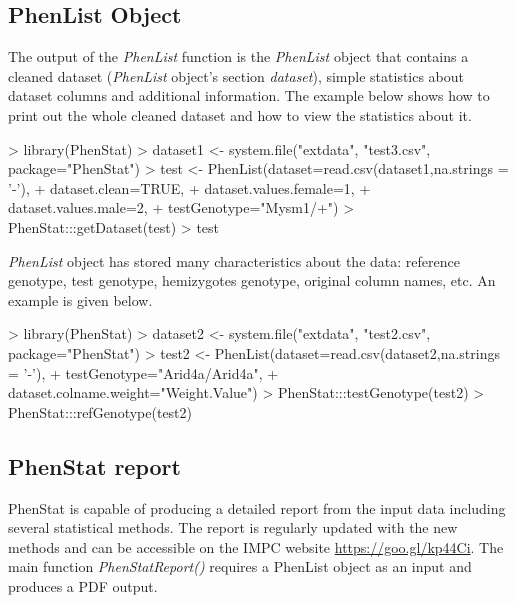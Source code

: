 \documentclass[a4paper]{article}
\begin{document}
\subsection{PhenList Object}
The output of the \textit{PhenList} function is the \textit{PhenList} object that contains a cleaned dataset
(\textit{PhenList} object's section \textit{dataset}), simple statistics about dataset columns and additional
information.
\newline\newline
The example below shows how to print out the whole cleaned dataset and how to view the statistics about it.

\begin{Schunk}
\begin{Sinput}
> library(PhenStat)
> dataset1 <- system.file("extdata", "test3.csv", package="PhenStat")
> test <- PhenList(dataset=read.csv(dataset1,na.strings = '-'),
+                  dataset.clean=TRUE,
+                  dataset.values.female=1,
+                  dataset.values.male=2,
+                  testGenotype="Mysm1/+")
> PhenStat:::getDataset(test)
> test
\end{Sinput}
\end{Schunk}
\textit{PhenList} object has stored many characteristics about the data: reference genotype, test genotype,
hemizygotes genotype, original column names, etc.
\newline
An example is given below.
\begin{Schunk}
\begin{Sinput}
> library(PhenStat)
> dataset2 <- system.file("extdata", "test2.csv", package="PhenStat")
> test2 <- PhenList(dataset=read.csv(dataset2,na.strings = '-'),
+                   testGenotype="Arid4a/Arid4a",
+                   dataset.colname.weight="Weight.Value")
> PhenStat:::testGenotype(test2)
> PhenStat:::refGenotype(test2)
\end{Sinput}
\end{Schunk}

\subsection{PhenStat report}
PhenStat is capable of producing a detailed report from the input data including several statistical methods. The report is regularly updated with the new methods and can be accessible on the IMPC website  \url{https://goo.gl/kp44Ci}. The main function \emph{PhenStatReport()} requires a PhenList object as an input and produces a PDF output.
\end{document}
